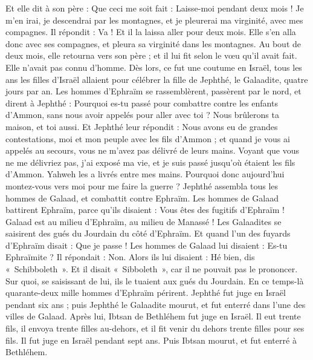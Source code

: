 \begin{multicols}{2}
Et elle dit à son père : Que ceci me soit fait : Laisse-moi pendant deux mois ! Je m'en irai, je descendrai par les montagnes, et je pleurerai ma virginité, avec mes compagnes.
Il répondit : Va ! Et il la laissa aller pour deux mois. Elle s'en alla donc avec ses compagnes, et pleura sa virginité dans les montagnes.
Au bout de deux mois, elle retourna vers son père ; et il lui fit selon le vœu qu'il avait fait. Elle n'avait pas connu d'homme. Dès lors, ce fut une coutume en Israël,
tous les ans les filles d'Israël allaient pour célébrer la fille de Jephthé, le Galaadite, quatre jours par an.
\VerseOne{}Les hommes d'Ephraïm se rassemblèrent, passèrent par le nord, et dirent à Jephthé : Pourquoi es-tu passé pour combattre contre les enfants d'Ammon, sans nous avoir appelés pour aller avec toi ? Nous brûlerons ta maison, et toi aussi.
Et Jephthé leur répondit : Nous avons eu de grandes contestations, moi et mon peuple avec les fils d'Ammon ; et quand je vous ai appelés au secours, vous ne m'avez pas délivré de leurs mains.
Voyant que vous ne me délivriez pas, j'ai exposé ma vie, et je suis passé jusqu'où étaient les fils d'Ammon. Yahweh les a livrés entre mes mains. Pourquoi donc aujourd'hui montez-vous vers moi pour me faire la guerre ?
Jephthé assembla tous les hommes de Galaad, et combattit contre Ephraïm. Les hommes de Galaad battirent Ephraïm, parce qu'ils disaient : Vous êtes des fugitifs d'Ephraïm ! Galaad est au milieu d'Ephraïm, au milieu de Manassé !
Les Galaadites se saisirent des gués du Jourdain du côté d'Ephraïm. Et quand l'un des fuyards d'Ephraïm disait : Que je passe ! Les hommes de Galaad lui disaient : Es-tu Ephraïmite ? Il répondait : Non.
Alors ils lui disaient : Hé bien, dis «~Schibboleth~». Et il disait «~Sibboleth~», car il ne pouvait pas le prononcer. Sur quoi, se saisissant de lui, ils le tuaient aux gués du Jourdain. En ce temps-là quarante-deux mille hommes d'Ephraïm périrent.
Jephthé fut juge en Israël pendant six ans ; puis Jephthé le Galaadite mourut, et fut enterré dans l'une des villes de Galaad.
Après lui, Ibtsan de Bethléhem fut juge en Israël.
Il eut trente fils, il envoya trente filles au-dehors, et il fit venir du dehors trente filles pour ses fils. Il fut juge en Israël pendant sept ans.
Puis Ibtsan mourut, et fut enterré à Bethléhem.

\end{multicols}

